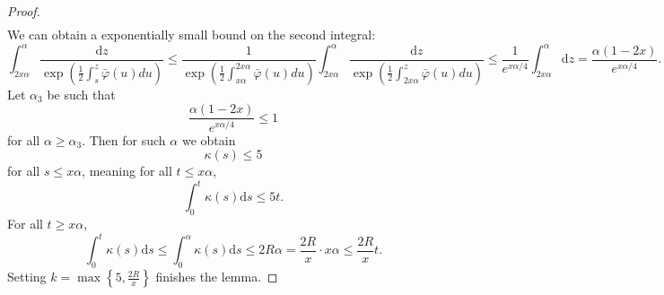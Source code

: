 \documentclass[10pt,a4paper]{amsart}
\begin{document}
\begin{proof}
\begin{align*}
    \end{align*}
    We can obtain a exponentially small bound on the second integral:
    \[\int_{2x\alpha}^\alpha\frac{\mathrm{d}z}{\exp(\frac 12\int_s^z\bar\varphi(u)du)} \leq \frac 1{\exp(\frac 12\int_{x\alpha}^{2x\alpha}\bar\varphi(u)du)}\int_{2x\alpha}^\alpha\frac{\mathrm{d}z}{\exp(\frac 12\int_{2x\alpha}^z\bar\varphi(u)du)}\leq \frac 1{e^{x\alpha/4}}\int_{2x\alpha}^\alpha \mathrm{d}z = \frac{\alpha(1-2x)}{e^{x\alpha/4}}.\]
    Let $\alpha_3$ be such that \[\frac{\alpha(1-2x)}{e^{x\alpha/4}}\leq 1\] for all $\alpha \geq \alpha_3$. Then for such $\alpha$ we obtain
    \[\kappa(s)\leq 5\]
    for all $s\leq x\alpha$, meaning for all $t\leq x\alpha$,
    \[\int_0^t\kappa(s)\mathrm{d}s\leq 5t.\]
    For all $t\geq x\alpha$,
    \[\int_0^t\kappa(s) \mathrm{d}s \leq \int_0^\alpha \kappa(s)\mathrm{d}s \leq 2R\alpha = \frac {2R}x\cdot x\alpha\leq \frac {2R}xt.\]
    Setting $k = \max\left\{5, \frac {2R}x\right\}$ finishes the lemma.
\end{proof}
\end{document}

